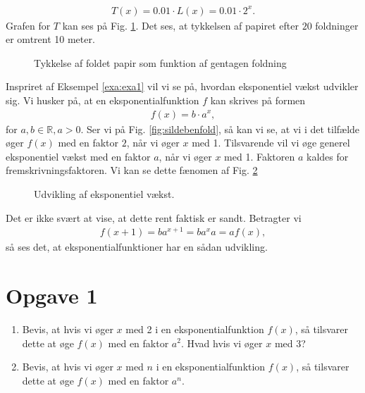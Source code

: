 \begin{exa}
\begin{align*}
T(x) = 0.01\cdot L(x) = 0.01\cdot2^x.
\end{align*}
Grafen for $T$ kan ses på Fig. \ref{fig:flagxfold2}. Det ses, at tykkelsen af papiret efter $20$ foldninger er omtrent 10 meter.
\begin{figure}[H]
\center
{}
\caption{Tykkelse af foldet papir som funktion af gentagen foldning}
\label{fig:flagxfold2}
\end{figure}
\end{exa}
Inspriret af Eksempel \ref{exa:exa1} vil vi se på, hvordan eksponentiel vækst udvikler sig. Vi husker på, at en eksponentialfunktion $f$ kan skrives på formen
\begin{align*}
f(x) = b\cdot a^x,
\end{align*}
for $a,b\in \mathbb{R},a>0$. Ser vi på Fig. \ref{fig:sildebenfold}, så kan vi se, at vi i det tilfælde øger $f(x)$ med en faktor $2$, når vi øger $x$ med 1. Tilsvarende vil vi øge generel eksponentiel vækst med en faktor $a$, når vi øger $x$ med 1. Faktoren $a$ kaldes for fremskrivningsfaktoren. Vi kan se dette fænomen af Fig. \ref{fig:sildegen}
\begin{figure}[H]
\center
{}
\caption{Udvikling af eksponentiel vækst.}
\label{fig:sildegen}
\end{figure}
Det er ikke svært at vise, at dette rent faktisk er sandt. Betragter vi
\begin{align*}
f(x+1) = ba^{x+1} = ba^xa = af(x),
\end{align*}
så ses det, at eksponentialfunktioner har en sådan udvikling.
\section*{Opgave 1}
\begin{enumerate}[label=\roman*)]
\item Bevis, at hvis vi øger $x$ med 2 i en eksponentialfunktion $f(x)$, så tilsvarer dette at øge $f(x)$ med en faktor $a^2$. Hvad hvis vi øger $x$ med $3$?
\item Bevis, at hvis vi øger $x$ med $n$ i en eksponentialfunktion $f(x)$, så tilsvarer dette at øge $f(x)$ med en faktor $a^n$.
\end{enumerate}
